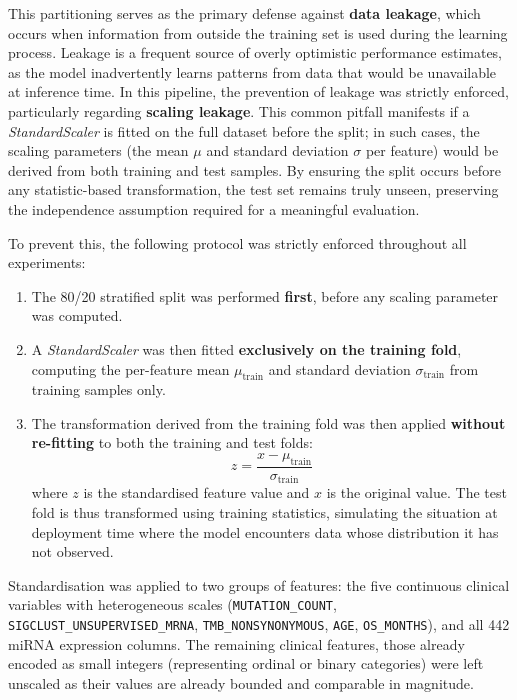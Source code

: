 This partitioning serves as the primary defense against \textbf{data leakage}, 
which occurs when information from outside the training set is used during the 
learning process. Leakage is a frequent source of overly optimistic performance 
estimates, as the model inadvertently learns patterns from data that would be 
unavailable at inference time. In this pipeline, the prevention of leakage was 
strictly enforced, particularly regarding \textbf{scaling leakage}. This common 
pitfall manifests if a \textit{StandardScaler} is fitted on the full dataset before the 
split; in such cases, the scaling parameters (the mean $\mu$ and standard 
deviation $\sigma$ per feature) would be derived from both training and test 
samples. By ensuring the split occurs before any statistic-based transformation, 
the test set remains truly unseen, preserving the independence assumption 
required for a meaningful evaluation.

To prevent this, the following protocol was strictly enforced throughout all
experiments:

\begin{enumerate}
    \item The 80/20 stratified split was performed \textbf{first}, before any
    scaling parameter was computed.

    \item A \textit{StandardScaler} was then fitted \textbf{exclusively on the
    training fold}, computing the per-feature mean $\mu_{\text{train}}$ and
    standard deviation $\sigma_{\text{train}}$ from training samples only.

    \item The transformation derived from the training fold was then applied
    \textbf{without re-fitting} to both the training and test folds:
    \begin{equation}
        z = \frac{x - \mu_{\text{train}}}{\sigma_{\text{train}}}
        \label{eq:zscore}
    \end{equation}
    where $z$ is the standardised feature value and $x$ is the original value.
    The test fold is thus transformed using training statistics, simulating the
    situation at deployment time where the model encounters data whose
    distribution it has not observed.
\end{enumerate}

Standardisation was applied to two groups of features: the five continuous
clinical variables with heterogeneous scales (\texttt{MUTATION\_COUNT},
\texttt{SIGCLUST\_UNSUPERVISED\_MRNA}, \texttt{TMB\_NONSYNONYMOUS},
\texttt{AGE}, \texttt{OS\_MONTHS}), and all 442 miRNA expression columns.
The remaining clinical features, those already encoded as small integers
(representing ordinal or binary categories) were left unscaled as their
values are already bounded and comparable in magnitude.

